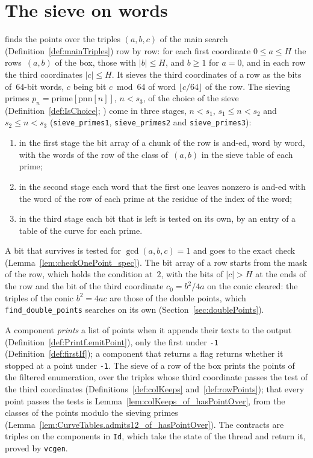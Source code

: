 \chapter{The sieve on words}\label{chap:words}

\jpoints{} finds the points over the triples $(a, b, c)$ of the main search
(Definition~\ref{def:mainTriples}) row by row: for each first coordinate $0 \le a \le H$ the
rows~$(a, b)$ of the box, those with $|b| \le H$, and $b \ge 1$ for $a = 0$, and in each row the third
coordinates $|c| \le H$. It sieves the third coordinates of a row as the bits of~$64$-bit words,
$c$ being bit $c \bmod 64$ of word $\lfloor c/64 \rfloor$ of the row. The sieving primes
$p_n = \mathrm{prime}[\mathrm{pnn}[n]]$, $n < s_3$, of the choice of the sieve
(Definition~\ref{def:IsChoice}; ) come in three stages, $n < s_1$,
$s_1 \le n < s_2$ and $s_2 \le n < s_3$ (\texttt{sieve\_primes1}, \texttt{sieve\_primes2} and
\texttt{sieve\_primes3}):
\begin{enumerate}
  \item in the first stage the bit array of a chunk of the row is and-ed, word by word, with the
    words of the row of the class of~$(a, b)$ in the sieve table of each prime;
  \item in the second stage each word that the first one leaves nonzero is and-ed with the word of
    the row of each prime at the residue of the index of the word;
  \item in the third stage each bit that is left is tested on its own, by an entry of a table of
    the curve for each prime.
\end{enumerate}
A bit that survives is tested for $\gcd(a, b, c) = 1$ and goes to the exact check
(Lemma~\ref{lem:checkOnePoint_spec}). The bit array of a row starts from the mask of the row, which
holds the condition at~$2$, with the bits of $|c| > H$ at the ends of the row and the bit of the
third coordinate $c_0 = b^2/4a$ on the conic cleared: the triples of the conic $b^2 = 4ac$ are those
of the double points, which \texttt{find\_double\_points} searches on its own
(Section~\ref{sec:doublePoints}).

A component \emph{prints} a list of points when it appends their texts to the output
(Definition~\ref{def:Printf.emitPoint}), only the first under \texttt{-1}
(Definition~\ref{def:firstIf}); a component that returns a flag returns whether it stopped at a
point under \texttt{-1}. The sieve of a row of the box prints the points of the filtered enumeration, over the triples whose
third coordinate passes the test of the third coordinates (Definitions~\ref{def:colKeeps}
and~\ref{def:rowPoints}); that every point passes the tests is
Lemma~\ref{lem:colKeeps_of_hasPointOver}, from the classes of the points modulo the sieving primes
(Lemma~\ref{lem:CurveTables.admits12_of_hasPointOver}). The contracts are triples on the
components in \texttt{Id}, which take the state of the thread and return it, proved by
\texttt{vcgen}.


